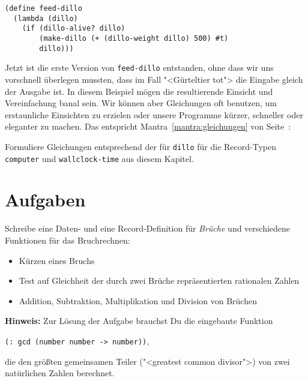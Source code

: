 %
\begin{lstlisting}
(define feed-dillo
  (lambda (dillo)
    (if (dillo-alive? dillo)
        (make-dillo (+ (dillo-weight dillo) 500) #t)
        dillo)))
\end{lstlisting}
%
Jetzt ist die erste Version von \lstinline{feed-dillo} entstanden, ohne
dass wir uns vorschnell überlegen mussten, dass im Fall "<Gürteltier
tot"> die Eingabe gleich der Ausgabe ist.  In diesem Beispiel mögen die
resultierende Einsicht und Vereinfachung banal sein.  Wir können aber
Gleichungen oft benutzen, um erstaunliche Einsichten zu erzielen oder
unsere Programme kürzer, schneller oder eleganter zu machen.  Das
entspricht Mantra~\ref{mantra:gleichungen} von
Seite~\pageref{mantra:gleichungen}:
%
\mantragleichungen*

\begin{aufgabeinline}
  Formuliere Gleichungen entsprechend der für \lstinline{dillo} für die
  Record-Typen \lstinline{computer} und \lstinline{wallclock-time} aus
  diesem Kapitel.
\end{aufgabeinline}

\section*{Aufgaben}

\begin{aufgabe}
  Schreibe eine Daten- und eine
  Record-Definition für \textit{Brüche} und verschiedene Funktionen
  für das Bruchrechnen:
  \begin{itemize}
  \item Kürzen eines Bruchs
  \item Test auf Gleichheit der durch zwei Brüche repräsentierten
    rationalen Zahlen
  \item Addition, Subtraktion, Multiplikation und Division von
    Brüchen
  \end{itemize}
%
  \textbf{Hinweis:} Zur Lösung der Aufgabe brauchst Du die eingebaute
  Funktion
  \begin{center}
    \lstinline{(: gcd (number number -> number))},
  \end{center}
  die den größten gemeinsamen Teiler ("<greatest common divisor">) von
  zwei natürlichen Zahlen berechnet.

\end{aufgabe}

